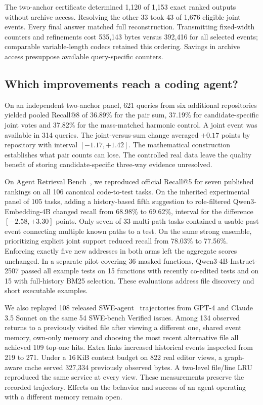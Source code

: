 \documentclass[conference]{IEEEtran}
\begin{document}
The two-anchor certificate determined 1,120 of 1,153 exact ranked outputs without archive access. Resolving the other 33 took 43 of 1,676 eligible joint events. Every final answer matched full reconstruction. Transmitting fixed-width counters and refinements cost 535,143 bytes versus 392,416 for all selected events; comparable variable-length codecs retained this ordering. Savings in archive access presuppose available query-specific counters.

\balance
\subsection{Which improvements reach a coding agent?}
On an independent two-anchor panel, 621 queries from six additional repositories yielded pooled Recall@8 of 36.89\% for the pair sum, 37.19\% for candidate-specific joint votes and 37.82\% for the mass-matched harmonic control. A joint event was available in 314 queries. The joint-versus-sum change averaged $+0.17$ points by repository with interval $[-1.17,+1.42]$. The mathematical construction establishes what pair counts can lose. The controlled real data leave the quality benefit of storing candidate-specific three-way evidence unresolved.

On Agent Retrieval Bench~\cite{arb}, we reproduced official Recall@5 for seven published rankings on all 106 canonical code-to-test tasks. On the inherited experimental panel of 105 tasks, adding a history-based fifth suggestion to role-filtered Qwen3-Embedding-4B changed recall from 68.98\% to 69.62\%, interval for the difference $[-2.58,+3.30]$ points. Only seven of 33 multi-path tasks contained a usable past event connecting multiple known paths to a test. On the same strong ensemble, prioritizing explicit joint support reduced recall from 78.03\% to 77.56\%. Enforcing exactly five new addresses in both arms left the aggregate scores unchanged. In a separate pilot covering 36 masked functions, Qwen3-4B-Instruct-2507 passed all example tests on 15 functions with recently co-edited tests and on 15 with full-history BM25 selection. These evaluations address file discovery and short executable examples.

We also replayed 108 released SWE-agent~\cite{sweagent} trajectories from GPT-4 and Claude 3.5 Sonnet on the same 54 SWE-bench Verified issues. Among 134 observed returns to a previously visited file after viewing a different one, shared event memory, own-only memory and choosing the most recent alternative file all achieved 109 top-one hits. Extra links increased historical events inspected from 219 to 271. Under a 16\,KiB content budget on 822 real editor views, a graph-aware cache served 327,334 previously observed bytes. A two-level file/line LRU reproduced the same service at every view. These measurements preserve the recorded trajectory. Effects on the behavior and success of an agent operating with a different memory remain open.
\end{document}
